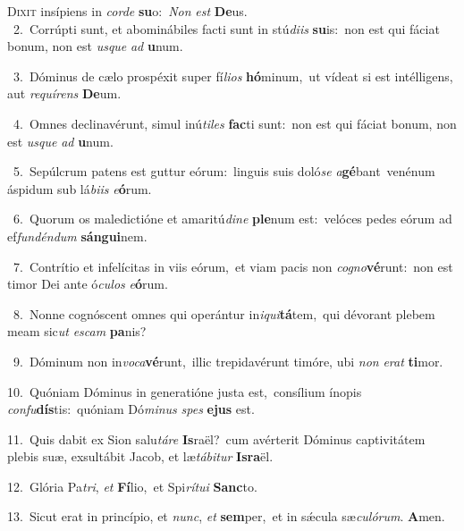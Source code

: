 \lettrine{\initial\textcolor{\initialcolor}{D}}{ixit} insípiens in \textit{cor}\-\textit{de} \textbf{su}\-o:~\star \textit{Non} \textit{est} \textbf{De}\-us.\\
{\numbfont\textcolor{\numbcolor}{~2.}}~Corrúpti sunt, et abominábiles facti sunt in stú\-\textit{di}\-\textit{is} \textbf{su}\-is:~\star non est qui fáciat bonum, non est \textit{us}\-\textit{que} \textit{ad} \textbf{u}\-num.\par
{\numbfont\textcolor{\numbcolor}{~3.}}~Dóminus de cælo prospéxit super fí\-\textit{li}\-\textit{os} \textbf{hó}\-minum,~\star ut vídeat si est intélligens, aut \textit{re}\-\textit{quí}\textit{rens} \textbf{De}\-um.\par
{\numbfont\textcolor{\numbcolor}{~4.}}~Omnes declinavérunt, simul inú\-\textit{ti}\-\textit{les} \textbf{fac}\-ti sunt:~\star non est qui fáciat bonum, non est \textit{us}\-\textit{que} \textit{ad} \textbf{u}\-num.\par
{\numbfont\textcolor{\numbcolor}{~5.}}~Sepúlcrum patens est guttur eórum:~\dagger linguis suis doló\textit{se} \textit{a}\-\textbf{gé}bant~\star venénum áspidum sub lá\-\textit{bi}\-\textit{is} \textit{e}\-\textbf{ó}rum.\par
{\numbfont\textcolor{\numbcolor}{~6.}}~Quorum os maledictióne et amaritú\-\textit{di}\-\textit{ne} \textbf{ple}\-num est:~\star velóces pedes eórum ad ef\-\textit{fun}\-\textit{dén}\textit{dum} \textbf{sán}\-\textbf{gui}nem.\par
{\numbfont\textcolor{\numbcolor}{~7.}}~Contrítio et infelícitas in viis eórum,~\dagger et viam pacis non \textit{co}\-\textit{gno}\textbf{vé}runt:~\star non est timor Dei ante ó\-\textit{cu}\-\textit{los} \textit{e}\-\textbf{ó}rum.\par
{\numbfont\textcolor{\numbcolor}{~8.}}~Nonne cognóscent omnes qui operántur in\-\textit{i}\-\textit{qui}\textbf{tá}tem,~\star qui dévorant plebem meam sic\textit{ut} \textit{es}\-\textit{cam} \textbf{pa}\-nis?\par
{\numbfont\textcolor{\numbcolor}{~9.}}~Dóminum non in\-\textit{vo}\-\textit{ca}\textbf{vé}runt,~\star illic trepidavérunt timóre, ubi \textit{non} \textit{e}\-\textit{rat} \textbf{ti}\-mor.\par
{\numbfont\textcolor{\numbcolor}{10.}}~Quóniam Dóminus in generatióne justa est,~\dagger consílium ínopis \textit{con}\-\textit{fu}\textbf{dís}tis:~\star quóniam Dó\-\textit{mi}\-\textit{nus} \textit{spes} \textbf{e}\-\textbf{jus} est.\par
{\numbfont\textcolor{\numbcolor}{11.}}~Quis dabit ex Sion salu\-\textit{tá}\-\textit{re} \textbf{Is}\-raël?~\star cum avérterit Dóminus captivitátem plebis suæ, exsultábit Jacob, et læ\-\textit{tá}\-\textit{bi}\textit{tur} \textbf{Is}\-\textbf{ra}ël.\par
{\numbfont\textcolor{\numbcolor}{12.}}~Glória Pa\-\textit{tri}\-, \textit{et} \textbf{Fí}\-lio,~\star et Spi\-\textit{rí}\-\textit{tu}\textit{i} \textbf{Sanc}\-to.\par
{\numbfont\textcolor{\numbcolor}{13.}}~Sicut erat in princípio, et \textit{nunc}\-, \textit{et} \textbf{sem}\-per,~\star et in sǽcula sæ\-\textit{cu}\-\textit{ló}\textit{rum}. \textbf{A}\-men.\par
